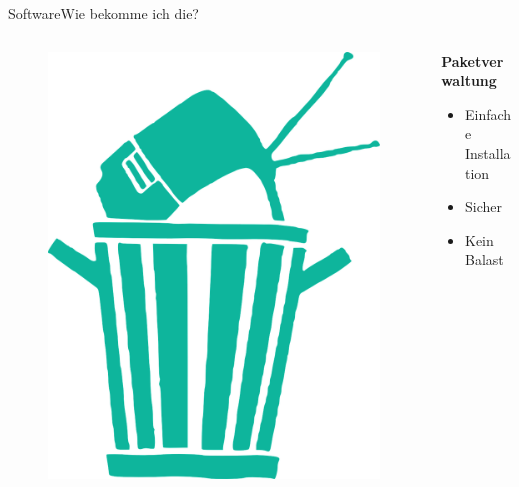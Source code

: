  \begin{frame}{Software}{Wie bekomme ich die?}

  \begin{columns}
  \begin{column}{0.3\textwidth}
 \begin{figure}
 \includegraphics[height=0.5\textheight]{resources/garbage-296550_1280.png}
 \end{figure}
\end{column}
\begin{column}{0.6\textwidth}
 \begin{center}
   \textbf{\large{ Paketverwaltung}}
 \end{center}
  \begin{itemize}
   \item Einfache Installation 
   \item Sicher 
   \item Kein Balast 
  \end{itemize}
  \end{column}
  \end{columns}
 \end{frame}

